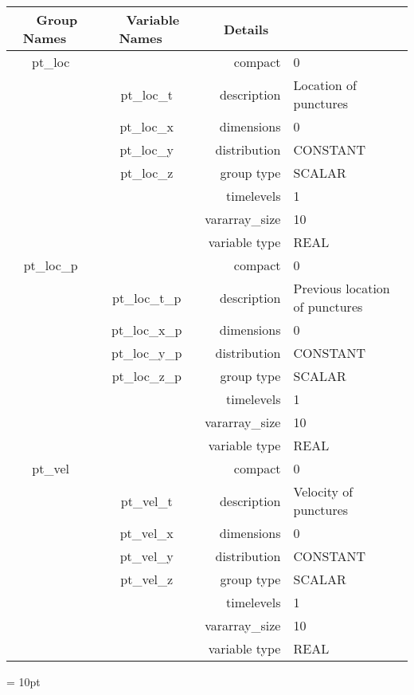 \begin{tabular*}{150mm}{|c|c@{\extracolsep{\fill}}|rl|} \hline 
~ {\bf Group Names} ~ & ~ {\bf Variable Names} ~  &{\bf Details} ~ & ~\\ 
\hline 
pt\_loc &  & compact & 0 \\ 
 & pt\_loc\_t & description & Location of punctures \\ 
 & pt\_loc\_x & dimensions & 0 \\ 
 & pt\_loc\_y & distribution & CONSTANT \\ 
 & pt\_loc\_z & group type & SCALAR \\ 
 &  & timelevels & 1 \\ 
 &  & vararray\_size & 10 \\ 
 &  & variable type & REAL \\ 
\hline 
pt\_loc\_p &  & compact & 0 \\ 
 & pt\_loc\_t\_p & description & Previous location of punctures \\ 
 & pt\_loc\_x\_p & dimensions & 0 \\ 
 & pt\_loc\_y\_p & distribution & CONSTANT \\ 
 & pt\_loc\_z\_p & group type & SCALAR \\ 
 &  & timelevels & 1 \\ 
 &  & vararray\_size & 10 \\ 
 &  & variable type & REAL \\ 
\hline 
pt\_vel &  & compact & 0 \\ 
 & pt\_vel\_t & description & Velocity of punctures \\ 
 & pt\_vel\_x & dimensions & 0 \\ 
 & pt\_vel\_y & distribution & CONSTANT \\ 
 & pt\_vel\_z & group type & SCALAR \\ 
 &  & timelevels & 1 \\ 
 &  & vararray\_size & 10 \\ 
 &  & variable type & REAL \\ 
\hline 
\end{tabular*} 



\vspace{5mm}\parskip = 10pt 

